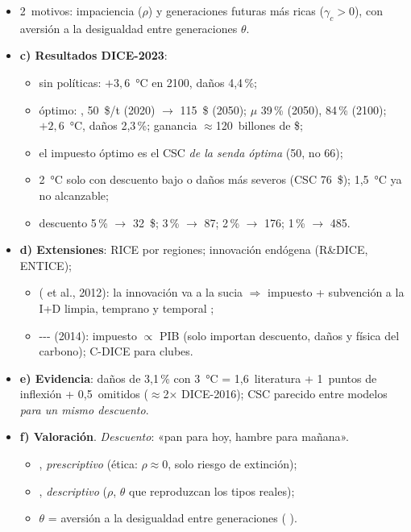 \documentclass{article}
\begin{document}
\begin{columnas}
\begin{itemize}
\item[] 2~motivos: impaciencia ($\rho$) y generaciones futuras más ricas ($\gamma_c>0$), con aversión a la desigualdad entre generaciones $\theta$.
\item \textbf{c) Resultados DICE-2023}:
  \begin{itemize}
  \item sin políticas: $+3{,}6$~°C en 2100, daños 4,4\,\%;
  \item óptimo: , 50~\$/t (2020) $\to$ 115~\$ (2050); $\mu$ 39\,\% (2050), 84\,\% (2100); $+2{,}6$~°C, daños 2,3\,\%; ganancia $\approx$120~billones de \$;
  \item el impuesto óptimo es el CSC \emph{de la senda óptima} (50, no 66);
  \item 2~°C solo con descuento bajo o daños más severos (CSC 76~\$); 1,5~°C ya no alcanzable;
  \item descuento 5\,\% $\to$ 32~\$; 3\,\% $\to$ 87; 2\,\% $\to$ 176; 1\,\% $\to$ 485.
  \end{itemize}
\item \textbf{d) Extensiones}: RICE por regiones; innovación endógena (R\&DICE, ENTICE);
  \begin{itemize}
  \item {} ( et al., 2012): la innovación va a la sucia $\Rightarrow$ impuesto + subvención a la I+D limpia, temprano y temporal ; \item {}--- (2014): impuesto $\propto$ PIB (solo importan descuento, daños y física del carbono); C-DICE para clubes.
  \end{itemize}
\item \textbf{e) Evidencia}: daños de 3,1\,\% con 3~°C = 1,6~literatura + 1~puntos de inflexión + 0,5~omitidos ($\approx$2× DICE-2016); CSC parecido entre modelos \emph{para un mismo descuento}.
\item \textbf{f) Valoración}. \emph{Descuento}: «pan para hoy, hambre para mañana».
  \begin{itemize}
  \item {}, \emph{prescriptivo} (ética: $\rho\approx0$, solo riesgo de extinción);
  \item {}, \emph{descriptivo} ($\rho$, $\theta$ que reproduzcan los tipos reales);
  \item $\theta$ = aversión a la desigualdad entre generaciones ( ).

\end{itemize}
\end{itemize}
\end{columnas}
\end{document}
